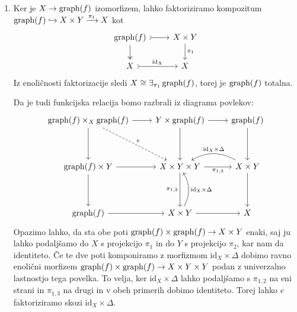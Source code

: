 \documentclass[../kategoricna_logika.tex]{subfiles}
\begin{document}
\begin{dokaz}
  \begin{enumerate}[label=(\roman*)]
  \item Ker je $X \to \operatorname{graph}(f)$ izomorfizem, lahko faktoriziramo
    kompozitum
    $\operatorname{graph}(f) \hookrightarrow X \times Y \xrightarrow{\pi_1} X$ kot
    \begin{equation*}
      \begin{tikzcd}
        \operatorname{graph}(f) \ar[d, two heads] \ar[r, tail]  & X \times Y \ar[d, "\pi_1"] \\
        X \ar[r, tail, "\mathrm{id}_X"] & X
      \end{tikzcd}
    \end{equation*}
    Iz enoličnosti faktorizacije sledi
    $X \cong \exists_{\pi_1}\operatorname{graph}(f)$, torej je $\operatorname{graph}(f)$ totalna.

    Da je tudi funkcijska relacija bomo razbrali iz diagrama povlekov:
    \begin{equation*}
      \begin{tikzcd}[row sep=9ex]
        \graf(f) \times_X \graf(f) \ar[d] \ar[r] \ar[dr, dashed, "e"] &
        Y \times \graf(f) \ar[d] \ar[r] & \graf(f) \ar[d]\\
        \graf(f) \times Y \ar[d] \ar[r] & X \times Y \times Y \ar[d, "\pi_{1,2}"'] \ar[r, "\pi_{1,3}"'] &
        X \times Y \ar[d] \ar[l, bend right, " \mathrm{id}_X \times \Delta"'] \\
        \graf(f) \ar[r] & X \times Y \ar[u, bend right, " \mathrm{id}_X \times \Delta"'] \ar[r] & X
      \end{tikzcd}
    \end{equation*}
    Opazimo lahko, da sta obe poti $\operatorname{graph}(f) \times \operatorname{graph}(f) \to X \times Y$ enaki, saj ju lahko
    podaljšamo do $X$ s projekcijo $\pi_1$ in do $Y$ s projekcijo $\pi_2$, kar nam da identiteto.
    Če te dve poti komponiramo z morfizmom $\mathrm{id}_X \times \Delta$ dobimo ravno enolični morfizem
    $\operatorname{graph}(f) \times \operatorname{graph}(f) \to X \times Y \times Y$ podan z univerzalno lastnostjo tega povelka.
    To velja, ker $\mathrm{id}_X \times \Delta$ lahko podaljšamo s $\pi_{1,2}$ na eni strani in
    $\pi_{1,3}$ na drugi in v obeh primerih dobimo identiteto. Torej lahko $e$ faktoriziramo
    skozi $\mathrm{id}_X \times \Delta$.


\end{enumerate}
\end{dokaz}
\end{document}
